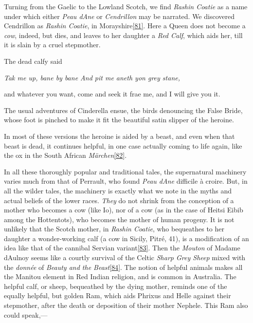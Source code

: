 \documentclass[14pt,a4paper]{memoir}
\begin{document}
Turning from the Gaelic to the Lowland Scotch, we find \emph{Rashin
Coatie} as a name under which either \emph{Peau d\textquotesingle Ane}
or \emph{Cendrillon} may be narrated. We discovered Cendrillon as
\emph{Rashin Coatie}, in
Morayshire\protect\hypertarget{4533318093929944247_33931-h-1.htm.xhtmlux5cux23FNanchor_81}{}{}\protect\hyperlink{4533318093929944247_33931-h-1.htm.xhtmlux5cux23Footnote_81}{{[}81{]}}.
Here a Queen does not become a \emph{cow}, indeed, but dies, and leaves
to her daughter a \emph{Red Calf}, which aids her, till it is slain by a
cruel stepmother.

The dead calfy said

\emph{{Tak me up, bane by bane} {And pit me aneth yon grey stane,}}

and whatever you want, come and seek it frae me, and I will give you it.

The usual adventures of Cinderella ensue, the birds denouncing the False
Bride, whose foot is pinched to make it fit the
\textquotesingle beautiful satin slipper\textquotesingle{} of the
heroine.

In most of these versions the heroine is aided by a beast, and even when
that beast is dead, it continues helpful, in one case actually coming to
life again, like the ox in the South African
\emph{Märchen}\protect\hypertarget{4533318093929944247_33931-h-1.htm.xhtmlux5cux23FNanchor_82}{}{}\protect\hyperlink{4533318093929944247_33931-h-1.htm.xhtmlux5cux23Footnote_82}{{[}82{]}}.

In all these thoroughly popular and traditional tales, the supernatural
machinery varies much from that of Perrault, who found \emph{Peau
d\textquotesingle Ane} \textquotesingle difficile à
croire.\textquotesingle{} But, in all the wilder tales, the machinery is
exactly what we note in the myths and actual beliefs of the lower races.
\emph{They} do not shrink from the conception of a mother who becomes a
cow (like Io), nor of a cow (as in the case of Heitsi Eibib among the
Hottentots), who becomes the mother of human progeny. It is not unlikely
that the Scotch mother, in \emph{Rashin Coatie}, who bequeathes to her
daughter a wonder-working calf (a cow in Sicily, Pitré, 41), is a
modification of an idea like that of the cannibal Servian
variant\protect\hypertarget{4533318093929944247_33931-h-1.htm.xhtmlux5cux23FNanchor_83}{}{}\protect\hyperlink{4533318093929944247_33931-h-1.htm.xhtmlux5cux23Footnote_83}{{[}83{]}}.
Then the \emph{Mouton} of Madame d\textquotesingle Aulnoy seems like a
courtly survival of the Celtic \emph{Sharp Grey Sheep} mixed with the
\emph{donnée} of \emph{Beauty and the
Beast}\protect\hypertarget{4533318093929944247_33931-h-1.htm.xhtmlux5cux23FNanchor_84}{}{}\protect\hyperlink{4533318093929944247_33931-h-1.htm.xhtmlux5cux23Footnote_84}{{[}84{]}}.
The notion of helpful animals makes all the
\textquotesingle Manitou\textquotesingle{} element in Red Indian
religion, and is common in Australia. The helpful calf, or sheep,
bequeathed by the dying mother, reminds one of the equally helpful, but
golden Ram, which aids Phrixus and Helle against their stepmother, after
the death or deposition of their mother Nephele. This Ram also could
speak,---
\end{document}
